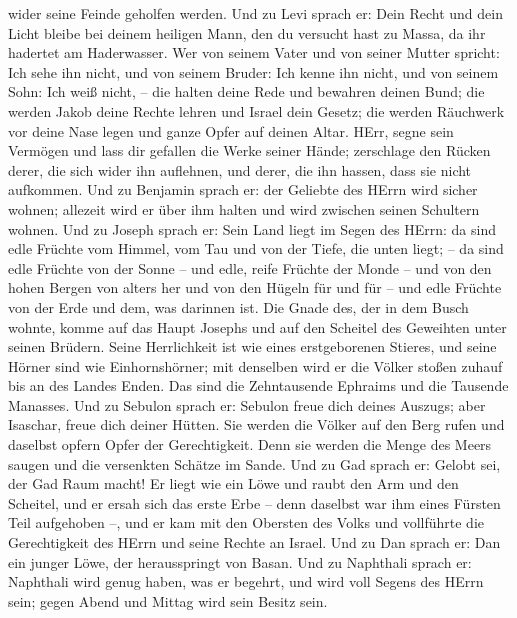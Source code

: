 wider seine Feinde geholfen werden.  Und zu Levi sprach er:
Dein Recht und dein Licht bleibe bei deinem heiligen Mann, den du
versucht hast zu Massa, da ihr hadertet am Haderwasser.  Wer
von seinem Vater und von seiner Mutter spricht: Ich sehe ihn nicht, und
von seinem Bruder: Ich kenne ihn nicht, und von seinem Sohn: Ich weiß
nicht, -- die halten deine Rede und bewahren deinen Bund; 
die werden Jakob deine Rechte lehren und Israel dein Gesetz; die werden
Räuchwerk vor deine Nase legen und ganze Opfer auf deinen Altar.
 HErr, segne sein Vermögen und lass dir gefallen die Werke
seiner Hände; zerschlage den Rücken derer, die sich wider ihn auflehnen,
und derer, die ihn hassen, dass sie nicht aufkommen.  Und
zu Benjamin sprach er: der Geliebte des HErrn wird sicher wohnen;
allezeit wird er über ihm halten und wird zwischen seinen Schultern
wohnen.  Und zu Joseph sprach er: Sein Land liegt im Segen
des HErrn: da sind edle Früchte vom Himmel, vom Tau und von der Tiefe,
die unten liegt; --  da sind edle Früchte von der Sonne --
und edle, reife Früchte der Monde --  und von den hohen
Bergen von alters her und von den Hügeln für und für -- 
und edle Früchte von der Erde und dem, was darinnen ist. Die Gnade des,
der in dem Busch wohnte, komme auf das Haupt Josephs und auf den
Scheitel des Geweihten unter seinen Brüdern.  Seine
Herrlichkeit ist wie eines erstgeborenen Stieres, und seine Hörner sind
wie Einhornshörner; mit denselben wird er die Völker stoßen zuhauf bis
an des Landes Enden. Das sind die Zehntausende Ephraims und die Tausende
Manasses.  Und zu Sebulon sprach er: Sebulon freue dich
deines Auszugs; aber Isaschar, freue dich deiner Hütten. 
Sie werden die Völker auf den Berg rufen und daselbst opfern Opfer der
Gerechtigkeit. Denn sie werden die Menge des Meers saugen und die
versenkten Schätze im Sande.  Und zu Gad sprach er: Gelobt
sei, der Gad Raum macht! Er liegt wie ein Löwe und raubt den Arm und den
Scheitel,  und er ersah sich das erste Erbe -- denn
daselbst war ihm eines Fürsten Teil aufgehoben --, und er kam mit den
Obersten des Volks und vollführte die Gerechtigkeit des HErrn und seine
Rechte an Israel.  Und zu Dan sprach er: Dan ein junger
Löwe, der herausspringt von Basan.  Und zu Naphthali sprach
er: Naphthali wird genug haben, was er begehrt, und wird voll Segens des
HErrn sein; gegen Abend und Mittag wird sein Besitz sein. 
